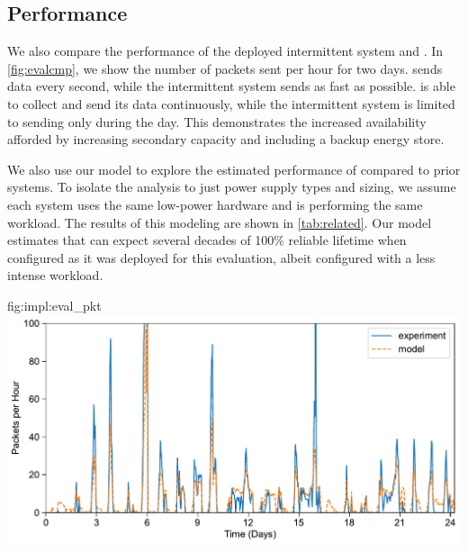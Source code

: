 \subsection{\name Performance}
\label{sec:eval:permamote}
We also compare the performance of the
deployed intermittent system and \name. In \cref{fig:evalcmp}, we show the
number of packets sent per hour for two days. \name sends data every
second, while the intermittent system sends as fast as possible. \name is
able to collect and send its data continuously, while the
intermittent system is limited to sending only during the day. This
demonstrates the increased availability afforded by increasing secondary
capacity and including a backup energy store.

We also use our model to explore the estimated performance of \name
compared to prior systems.
To isolate the analysis to just power supply types and sizing, we assume each
system uses the same low-power hardware and is performing the same workload.
The results of this modeling are shown in \cref{tab:related}. Our model estimates that
\name can expect several decades of 100\% reliable lifetime when configured as
it was deployed for this evaluation, albeit configured with a less intense workload.


\begin{definefigure}{fig:impl:eval_pkt}
    \centering
    \includegraphics[width=\linewidth]{figs/capacity/experiment_pkt/exp_vs_sim_pkt}
    \label{fig:eval:pkt}
    \caption{Performance comparison of model expectation versus real batteryless system. 
    Data from a three month deployment of two systems is used to verify our model.
    We use three weeks of illuminance measurements %
    to estimate irradiance and model the number of packets transmitted by an
    intermittent node. Average daily error is 15\%, with a standard deviation
    of 17\%. 
    } 
\end{definefigure}

